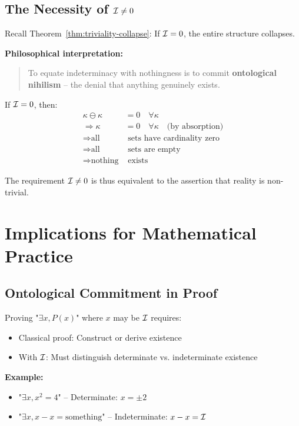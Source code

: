 \subsection{The Necessity of $\mathcal{I} \neq 0$}

Recall Theorem~\ref{thm:triviality-collapse}: If $\mathcal{I} = 0$, the entire structure collapses.

\textbf{Philosophical interpretation:}

\begin{quote}
To equate indeterminacy with nothingness is to commit \textbf{ontological nihilism} -- the denial that anything genuinely exists.
\end{quote}

If $\mathcal{I} = 0$, then:
\begin{align*}
\kappa \ominus \kappa &= 0 \quad \forall \kappa \\
\Rightarrow \kappa &= 0 \quad \forall \kappa \quad \text{(by absorption)} \\
\Rightarrow \text{all} &\text{ sets have cardinality zero} \\
\Rightarrow \text{all} &\text{ sets are empty} \\
\Rightarrow \text{nothing} &\text{ exists}
\end{align*}

The requirement $\mathcal{I} \neq 0$ is thus equivalent to the assertion that reality is non-trivial.

\section{Implications for Mathematical Practice}

\subsection{Ontological Commitment in Proof}

\begin{proposition}
Proving "$\exists x, P(x)$" where $x$ may be $\mathcal{I}$ requires:
\begin{itemize}
    \item Classical proof: Construct or derive existence
    \item With $\mathcal{I}$: Must distinguish determinate vs. indeterminate existence
\end{itemize}
\end{proposition}

\textbf{Example:}
\begin{itemize}
    \item "$\exists x, x^2 = 4$" -- Determinate: $x = \pm 2$
    \item "$\exists x, x - x = \text{something}$" -- Indeterminate: $x - x = \mathcal{I}$
\end{itemize}

